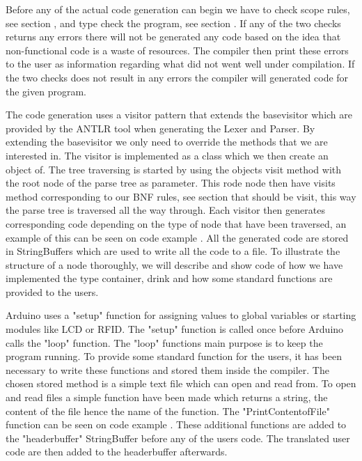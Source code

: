 Before any of the actual code generation can begin we have to check scope rules, see section , and type check the program, see section . If any of the two checks returns any errors there will not be generated any code based on the idea that non-functional code is a waste of resources. The compiler then print these errors to the user as information regarding what did not went well under compilation. If the two checks does not result in any errors the compiler will generated code for the given program.

The code generation uses a visitor pattern that extends the basevisitor which are provided by the ANTLR tool when generating the Lexer and Parser. By extending the basevisitor we only need to override the methods that we are interested in. The visitor is implemented as a class which we then create an object of. The tree traversing is started by using the objects visit method with the root node of the parse tree as parameter. This rode node then have visits method corresponding to our BNF rules, see section  that should be visit, this way the parse tree is traversed all the way through. Each visitor then generates corresponding code depending on the type of node that have been traversed, an example of this can be seen on code example . All the generated code are stored in StringBuffers which are used to write all the code to a file. To illustrate the structure of a node thoroughly, we will describe and show code of how we have implemented the type container, drink and how some standard functions are provided to the users.

Arduino uses a "setup" function for assigning values to global variables or starting modules like LCD or RFID. The "setup" function is called once before Arduino calls the "loop" function. The "loop" functions main purpose is to keep the program running. To provide some standard function for the users, it has been necessary to write these functions and stored them inside the compiler. The chosen stored method is a simple text file which can open and read from. To open and read files a simple function have been made which returns a string, the content of the file hence the name of the function. The "PrintContentofFile" function can be seen on code example . These additional functions are added to the "headerbuffer" StringBuffer before any of the users code. The translated user code are then added to the headerbuffer afterwards.

